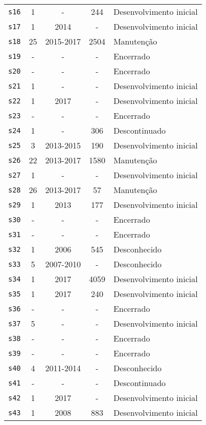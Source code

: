 \begin{longtable}{ l c c c l }
    \texttt{s16} & 1 & - & 244 & Desenvolvimento inicial \\
    \texttt{s17} & 1 & 2014 & - & Desenvolvimento inicial \\
    \texttt{s18} & 25 & 2015-2017 & 2504 & Manutenção \\
    \texttt{s19} & - & - & - & Encerrado \\
    \texttt{s20} & - & - & - & Encerrado \\
    \texttt{s21} & 1 & - & - & Desenvolvimento inicial \\
    \texttt{s22} & 1 & 2017 & - & Desenvolvimento inicial \\
    \texttt{s23} & - & - & - & Encerrado \\
    \texttt{s24} & 1 & - & 306 & Descontinuado \\
    \texttt{s25} & 3 & 2013-2015 & 190 & Desenvolvimento inicial \\
    \texttt{s26} & 22 & 2013-2017 & 1580 & Manutenção \\
    \texttt{s27} & 1 & - & - & Desenvolvimento inicial \\
    \texttt{s28} & 26 & 2013-2017 & 57 & Manutenção \\
    \texttt{s29} & 1 & 2013 & 177 & Desenvolvimento inicial \\
    \texttt{s30} & - & - & - & Encerrado \\
    \texttt{s31} & - & - & - & Encerrado \\
    \texttt{s32} & 1 & 2006 & 545 & Desconhecido \\
    \texttt{s33} & 5 & 2007-2010 & - & Desconhecido \\
    \texttt{s34} & 1 & 2017 & 4059 & Desenvolvimento inicial \\
    \texttt{s35} & 1 & 2017 & 240 & Desenvolvimento inicial \\
    \texttt{s36} & - & - & - & Encerrado \\
    \texttt{s37} & 5 & - & - & Desenvolvimento inicial \\
    \texttt{s38} & - & - & - & Encerrado \\
    \texttt{s39} & - & - & - & Encerrado \\
    \texttt{s40} & 4 & 2011-2014 & - & Desconhecido \\
    \texttt{s41} & - & - & - & Descontinuado \\
    \texttt{s42} & 1 & 2017 & - & Desenvolvimento inicial \\
    \texttt{s43} & 1 & 2008 & 883 & Desenvolvimento inicial \\

\end{longtable}
